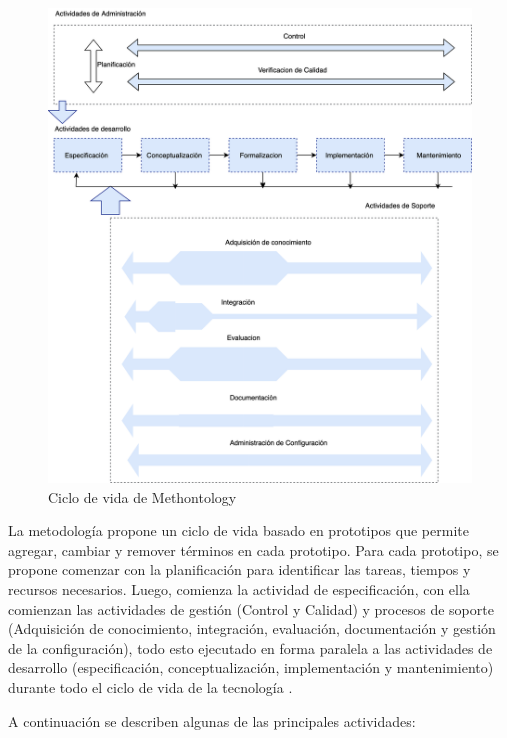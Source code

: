 \begin{figure}[h!]
    \centering
    \includegraphics[width=150mm]{figuras/Diagramas-MethontologyProcess}
    \caption{Ciclo de vida de Methontology \cite{Corcho2003BuildingLO}}
    \label{img:methontology}
    \end{figure}
    
    
La metodología propone un ciclo de vida basado en prototipos que permite agregar, cambiar y remover términos en cada prototipo. Para cada prototipo, se propone comenzar con la planificación para identificar las tareas, tiempos y recursos necesarios. Luego, comienza la actividad de especificación, con ella comienzan las actividades de gestión (Control y Calidad) y procesos de soporte (Adquisición de conocimiento, integración, evaluación, documentación y gestión de la configuración), todo esto ejecutado en forma paralela a las actividades de desarrollo (especificación, conceptualización, implementación y mantenimiento) durante todo el ciclo de vida de la tecnología \cite{fernandez1997methontology}.
 
A continuación se describen algunas de las principales actividades:

